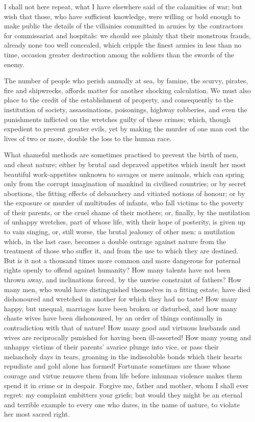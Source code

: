 \documentclass[12pt]{report}
\begin{document}
I shall not here repeat, what I have elsewhere said of the calamities of war; but wish that those, who have sufficient knowledge, were willing or bold enough to make public the details of the villainies committed in armies by the contractors for commissariat and hospitals: we should see plainly that their monstrous frauds, already none too well concealed, which cripple the finest armies in less than no time, occasion greater destruction among the soldiers than the swords of the enemy.

The number of people who perish annually at sea, by famine, the scurvy, pirates, fire and shipwrecks, affords matter for another shocking calculation. We must also place to the credit of the establishment of property, and consequently to the institution of society, assassinations, poisonings, highway robberies, and even the punishments inflicted on the wretches guilty of these crimes; which, though expedient to prevent greater evils, yet by making the murder of one man cost the lives of two or more, double the loss to the human race.

What shameful methods are sometimes practised to prevent the birth of men, and cheat nature; either by brutal and depraved appetites which insult her most beautiful work-appetites unknown to savages or mere animals, which can spring only from the corrupt imagination of mankind in civilised countries; or by secret abortions, the fitting effects of debauchery and vitiated notions of honour; or by the exposure or murder of multitudes of infants, who fall victims to the poverty of their parents, or the cruel shame of their mothers; or, finally, by the mutilation of unhappy wretches, part of whose life, with their hope of posterity, is given up to vain singing, or, still worse, the brutal jealousy of other men: a mutilation which, in the last case, becomes a double outrage against nature from the treatment of those who suffer it, and from the use to which they are destined. But is it not a thousand times more common and more dangerous for paternal rights openly to offend against humanity? How many talents have not been thrown away, and inclinations forced, by the unwise constraint of fathers? How many men, who would have distinguished themselves in a fitting estate, have died dishonoured and wretched in another for which they had no taste! How many happy, but unequal, marriages have been broken or disturbed, and how many chaste wives have been dishonoured, by an order of things continually in contradiction with that of nature! How many good and virtuous husbands and wives are reciprocally punished for having been ill-assorted! How many young and unhappy victims of their parents' avarice plunge into vice, or pass their melancholy days in tears, groaning in the indissoluble bonds which their hearts repudiate and gold alone has formed! Fortunate sometimes are those whose courage and virtue remove them from life before inhuman violence makes them spend it in crime or in despair. Forgive me, father and mother, whom I shall ever regret: my complaint embitters your griefs; but would they might be an eternal and terrible example to every one who dares, in the name of nature, to violate her most sacred right.
\end{document}
